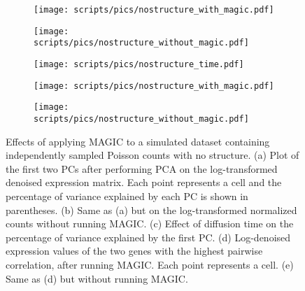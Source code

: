 \documentclass[10pt,letterpaper]{article}
\begin{document}
\begin{figure}[btp]
\centering
\begin{subfigure}[b]{0.49\textwidth}
    \texttt{[image: scripts/pics/nostructure\_with\_magic.pdf]}
    \caption{}
\end{subfigure}
\begin{subfigure}[b]{0.49\textwidth}
    \texttt{[image: scripts/pics/nostructure\_without\_magic.pdf]}
    \caption{}
\end{subfigure}
\begin{subfigure}[b]{\textwidth}
    \texttt{[image: scripts/pics/nostructure\_time.pdf]}
    \caption{}
\end{subfigure}
\begin{subfigure}[b]{0.49\textwidth}
    \texttt{[image: scripts/pics/nostructure\_with\_magic.pdf]}
    \caption{}
\end{subfigure}
\begin{subfigure}[b]{0.49\textwidth}
    \texttt{[image: scripts/pics/nostructure\_without\_magic.pdf]}
    \caption{}
\end{subfigure}
\caption{Effects of applying MAGIC to a simulated dataset containing independently sampled Poisson counts with no structure.
(a) Plot of the first two PCs after performing PCA on the log-transformed denoised expression matrix.
Each point represents a cell and the percentage of variance explained by each PC is shown in parentheses.
(b) Same as (a) but on the log-transformed normalized counts without running MAGIC.
(c) Effect of diffusion time on the percentage of variance explained by the first PC.
(d) Log-denoised expression values of the two genes with the highest pairwise correlation, after running MAGIC.
Each point represents a cell.
(e) Same as (d) but without running MAGIC.}
\label{fig:nostructure}
\end{figure}
\end{document}
